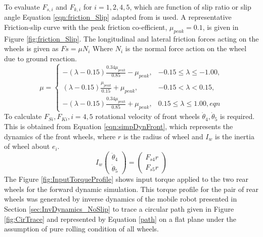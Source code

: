 {To evaluate $F_{s,i} $ and $F_{k,i}$ for $i=1,2,4,5$,   which are function of  slip ratio or slip angle  Equation \ref{eqn:friction_Slip} adapted from \cite{balakrishna1995modeling}is used.  A representative Friction-slip curve with the peak friction co-efficient, $\mu_{peak}=0.1$, is given in  Figure \ref{fig:friction_Slip}. The longitudinal and lateral friction forces acting on the wheels is given as $Fs=\mu N_i$ Where $N_i$ is the normal force action on the wheel due to ground reaction.  
\begin{equation}
\label{eqn:friction_Slip}
\mu =
\begin{cases}
-(\lambda-0.15)\frac{0.34\mu_{peak}}{0.85}-\mu_{peak}, & -0.15\le\lambda \le -1.00,\\
(\lambda-0.15)\frac{\mu_{peak}}{0.15}+\mu_{peak}, & -0.15<\lambda<0.15,
\\
-(\lambda-0.15)\frac{0.34\mu_{peak}}{0.85}+\mu_{peak}, & 0.15\le\lambda \le 1.00,
eqn
\end{cases}
\end{equation}
To calculate $F_{Si},F_{Ki}, i=4,5$ rotational velocity of front wheels $\dot\theta_4,\dot\theta_5$ is required. This is obtained from Equation \ref{eqn:simpDynFront}, which represents the dynamics  of the front wheels, where $r$ is the radius of wheel and $I_w$ is the inertia of wheel about $e_i$.
\begin{equation}
\label{eqn:simpDynFront}
I_w\begin{pmatrix}
 \ddot\theta_4\\
 \ddot\theta_5
\end{pmatrix}
=
\begin{pmatrix}
F_{s4} r\\
F_{s5} r
\end{pmatrix}
\end{equation}
The Figure \ref{fig:InputTorqueProfile} shows input torque applied to the two rear wheels for the forward dynamic simulation. This torque profile for the pair of rear wheels was generated by inverse dynamics  of the mobile robot presented in Section \ref{sec:InvDynamics_NoSlip} to trace a circular path given in Figure \ref{fig:CirTrace} and represented by Equation \ref{path} on a flat plane under the assumption of pure rolling condition of all wheels. 

}

